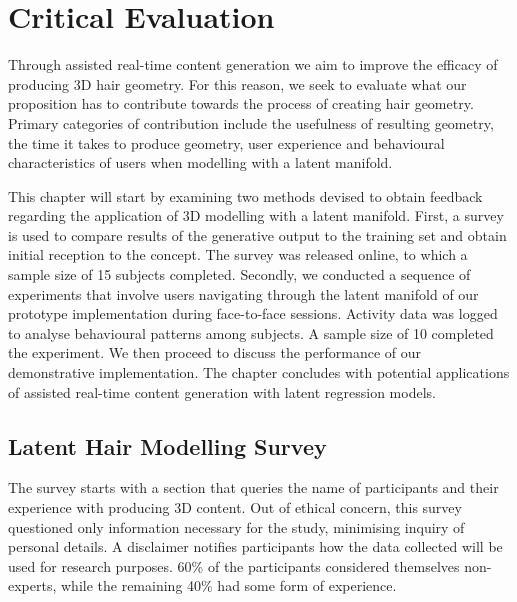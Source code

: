 \documentclass[ %
author={Dillon Keith Diep},
supervisor={Dr. Carl Henrik Ek},
degree={MEng},
title={ART-CG Hair:},
subtitle={Assisted Real-time Content Generation of Stylised Virtual Hair},
type={Research},
year={2017} ]{dissertation}
\begin{document}
	
	\chapter{Critical Evaluation}
	\label{chap:evaluation}
	Through assisted real-time content generation we aim to improve the efficacy of producing 3D hair geometry. For this reason, we seek to evaluate what our proposition has to contribute towards the process of creating hair geometry. Primary categories of contribution include the usefulness of resulting geometry, the time it takes to produce geometry, user experience and behavioural characteristics of users when modelling with a latent manifold.
	
	This chapter will start by examining two methods devised to obtain feedback regarding the application of 3D modelling with a latent manifold. First, a survey is used to compare results of the generative output to the training set and obtain initial reception to the concept. The survey was released online, to which a sample size of 15 subjects completed. Secondly, we conducted a sequence of experiments that involve users navigating through the latent manifold of our prototype implementation during face-to-face sessions. Activity data was logged to analyse behavioural patterns among subjects. A sample size of 10 completed the experiment. We then proceed to discuss the performance of our demonstrative implementation. The chapter concludes with potential applications of assisted real-time content generation with latent regression models.
	
	\section{Latent Hair Modelling Survey}
	\label{evaluation:survey}
	The survey starts with a section that queries the name of participants and their experience with producing 3D content. Out of ethical concern, this survey questioned only information necessary for the study, minimising inquiry of personal details. A disclaimer notifies participants how the data collected will be used for research purposes. 60\% of the participants considered themselves non-experts, while the remaining 40\% had some form of experience.
	
\end{document}
